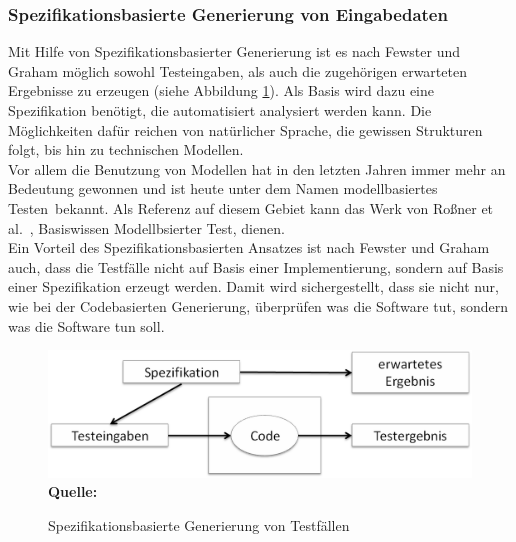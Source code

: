 \subsubsection{Spezifikationsbasierte Generierung von Eingabedaten}
\label{subsubsec:spezifikationsbasierte_generierung}
Mit Hilfe von Spezifikationsbasierter Generierung ist es nach Fewster und Graham \cite[vgl. S. 21]{fewster_software_1999} möglich sowohl Testeingaben, als auch die zugehörigen erwarteten Ergebnisse zu erzeugen (siehe Abbildung \ref{fig:specBasedDesign}). Als Basis wird dazu eine Spezifikation benötigt, die automatisiert analysiert werden kann. Die Möglichkeiten dafür reichen von natürlicher Sprache, die gewissen Strukturen folgt, bis hin zu technischen Modellen.\\ Vor allem die Benutzung von Modellen hat in den letzten Jahren immer mehr an Bedeutung gewonnen und ist heute unter dem Namen \grq modellbasiertes Testen\grq\ bekannt. Als Referenz auf diesem Gebiet kann das Werk von Roßner et al.\ \cite{rossner_basiswissen_2010}, \grq Basiswissen Modellbsierter Test\grq, dienen.\\
Ein Vorteil des Spezifikationsbasierten Ansatzes ist nach Fewster und Graham \cite[vgl. S. 21]{fewster_software_1999} auch, dass die Testfälle nicht auf Basis einer Implementierung, sondern auf Basis einer Spezifikation erzeugt werden. Damit wird sichergestellt, dass sie nicht nur, wie bei der Codebasierten Generierung, überprüfen \grq was die Software tut\grq , sondern \grq was die Software tun soll\grq.

\begin{figure}[htb]
  \centering  
  \includegraphics[scale=0.6]{img/specBasedDesign.png}\\
  \footnotesize\sffamily\textbf{Quelle:} \cite[vgl. S. 21]{fewster_software_1999}
  \caption{Spezifikationsbasierte Generierung von Testfällen}
  \label{fig:specBasedDesign}
\end{figure}

